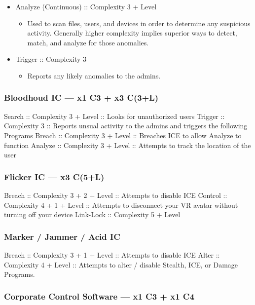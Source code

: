 \begin{multicols}{2}
	\begin{itemize}
		\itemsep 0pt
		\item Analyze (Continuous) :: Complexity 3 + Level
		\begin{itemize}
			\itemsep 0pt
			\item Used to scan files, users, and devices in order to determine any suspicious activity. Generally higher complexity implies superior ways to detect, match, and analyze for those anomalies.
		\end{itemize}
		\item Trigger :: Complexity 3
		\begin{itemize}
			\itemsep 0pt
			\item Reports any likely anomalies to the admins.
		\end{itemize}
	\end{itemize}

	\subsubsection{Bloodhoud IC — x1 C3 + x3 C(3+L)}
	
	Search :: Complexity 3 + Level :: Looks for unauthorized users
	Trigger :: Complexity 3 :: Reports unsual activity to the admins and triggers the following Programs
	Breach :: Complexity 3 + Level :: Breaches ICE to allow Analyze to function
	Analyze :: Complexity 3 + Level :: Attempts to track the location of the user
	
	\subsubsection{Flicker IC — x3 C(5+L)}
	
	Breach :: Complexity 3 + 2 + Level :: Attempts to disable ICE
	Control :: Complexity 4 + 1 + Level :: Attempts to disconnect your VR avatar without turning off your device
	Link-Lock :: Complexity 5 + Level
	
	\subsubsection{Marker / Jammer / Acid IC}
	
	Breach :: Complexity 3 + 1 + Level :: Attempts to disable ICE
	Alter :: Complexity 4 + Level :: Attempts to alter / disable Stealth, ICE, or Damage Programs.
	
	\subsubsection{Corporate Control Software — x1 C3 + x1 C4}
	

\end{multicols}
